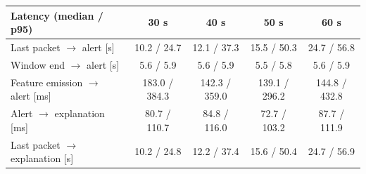 \begin{tabular}{lcccc}
\toprule
\textbf{Latency (median / p95)} & \textbf{30 s} & \textbf{40 s} & \textbf{50 s} & \textbf{60 s} \\
\midrule
Last packet $\rightarrow$ alert [s] & 10.2 / 24.7 & 12.1 / 37.3 & 15.5 / 50.3 & 24.7 / 56.8 \\
Window end $\rightarrow$ alert [s] & 5.6 / 5.9 & 5.6 / 5.9 & 5.5 / 5.8 & 5.6 / 5.9 \\
Feature emission $\rightarrow$ alert [ms] & 183.0 / 384.3 & 142.3 / 359.0 & 139.1 / 296.2 & 144.8 / 432.8 \\
Alert $\rightarrow$ explanation [ms] & 80.7 / 110.7 & 84.8 / 116.0 & 72.7 / 103.2 & 87.7 / 111.9 \\
Last packet $\rightarrow$ explanation [s] & 10.2 / 24.8 & 12.2 / 37.4 & 15.6 / 50.4 & 24.7 / 56.9 \\
\bottomrule
\end{tabular}
